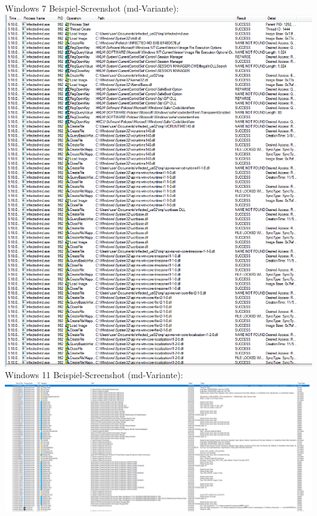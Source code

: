 \documentclass{article}
\begin{document}
	\noindent Windows 7 Beispiel-Screenshot (md-Variante):\\
	\includegraphics[width=0.7\linewidth]{"pictures/1.7 event class file2"}\\
		
	\noindent Windows 11 Beispiel-Screenshot (md-Variante):\\
	\includegraphics[width=1\linewidth]{"pictures/1.7 event class file3"}\\
	
\end{document}
